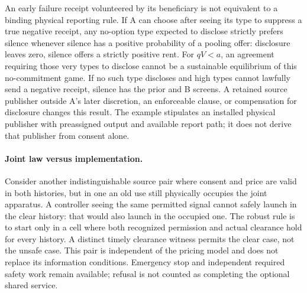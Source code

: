 \documentclass{article}
\begin{document}
An early failure receipt volunteered by its beneficiary is not equivalent to a binding physical reporting rule. If A can choose after seeing its type to suppress a true negative receipt, any no-option type expected to disclose strictly prefers silence whenever silence has a positive probability of a pooling offer: disclosure leaves zero, silence offers a strictly positive rent. For $qV<a$, an agreement requiring those very types to disclose cannot be a sustainable equilibrium of this no-commitment game. If no such type discloses and high types cannot lawfully send a negative receipt, silence has the prior and B screens. A retained source publisher outside A's later discretion, an enforceable clause, or compensation for disclosure changes this result. The example stipulates an installed physical publisher with preassigned output and available report path; it does not derive that publisher from consent alone.

\paragraph{Joint law versus implementation.}
Consider another indistinguishable source pair where consent and price are valid in both histories, but in one an old use still physically occupies the joint apparatus. A controller seeing the same permitted signal cannot safely launch in the clear history: that would also launch in the occupied one. The robust rule is to start only in a cell where both recognized permission and actual clearance hold for every history. A distinct timely clearance witness permits the clear case, not the unsafe case. This pair is independent of the pricing model and does not replace its information conditions. Emergency stop and independent required safety work remain available; refusal is not counted as completing the optional shared service.
\end{document}
